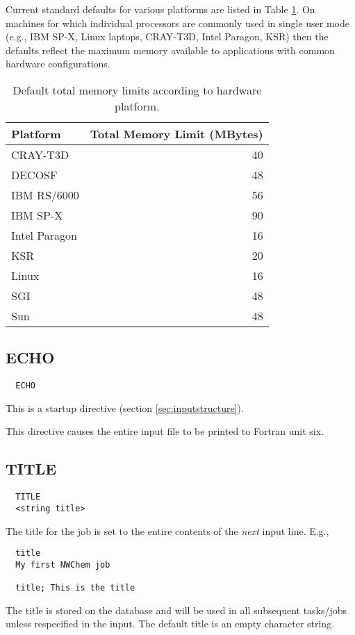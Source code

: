 Current standard defaults for various platforms are listed in Table
\ref{tbl:default-memory-limits}.  On machines for which individual
processors are commonly used in single user mode (e.g., IBM SP-X,
Linux laptops, CRAY-T3D, Intel Paragon, KSR) then the defaults reflect
the maximum memory available to applications with common hardware
configurations.
\begin{table}
\caption{Default total memory limits according to hardware platform.}
\label{tbl:default-memory-limits}
\begin{tabular}{lr}
\hline\hline
Platform        & Total Memory Limit (MBytes) \\
\hline
CRAY-T3D        & 40 \\
DECOSF          & 48 \\
IBM RS/6000     & 56 \\
IBM SP-X        & 90 \\
Intel Paragon   & 16 \\
KSR             & 20 \\
Linux           & 16 \\
SGI             & 48 \\
Sun             & 48 \\
\hline\hline
\end{tabular}
\end{table}

\subsection{ECHO}

\begin{verbatim}
  ECHO
\end{verbatim}

This is a startup directive (section \ref{sec:inputstructure}).

This directive causes the entire input file to be printed to Fortran
unit six.

\subsection{TITLE}

\begin{verbatim}
  TITLE 
  <string title>
\end{verbatim}

  The title for the job is set to the entire contents of the {\em
next} input line.  E.g.,
\begin{verbatim}
  title
  My first NWChem job

  title; This is the title
\end{verbatim}
The title is stored on the database and will be used in all subsequent
tasks/jobs unless respecified in the input.  The default title is an
empty character string.

